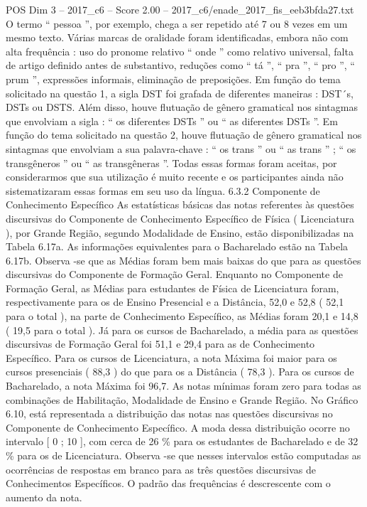 \begin{textsample}{POS Dim 3 – 2017\_c6 – Score 2.00 – 2017\_c6/enade\_2017\_fis\_eeb3bfda27.txt}
O termo “ pessoa ”, por exemplo, chega a ser repetido até 7 ou 8 vezes em um mesmo texto.
Várias marcas de oralidade foram identificadas, embora não com alta frequência : uso do pronome relativo “ onde ” como relativo universal, falta de artigo definido antes de substantivo, reduções como “ tá ”, “ pra ”, “ pro ”, “ prum ”, expressões informais, eliminação de preposições.
Em função do tema solicitado na questão 1, a sigla DST foi grafada de diferentes maneiras : DST´s, DSTs ou DSTS.
Além disso, houve flutuação de gênero gramatical nos sintagmas que envolviam a sigla : “ os diferentes DSTs ” ou “ as diferentes DSTs ”.
Em função do tema solicitado na questão 2, houve flutuação de gênero gramatical nos sintagmas que envolviam a sua palavra-chave : “ os trans ” ou “ as trans ” ; “ os transgêneros ” ou “ as transgêneras ”.
Todas essas formas foram aceitas, por considerarmos que sua utilização é muito recente e os participantes ainda não sistematizaram essas formas em seu uso da língua. 6.3.2 Componente de Conhecimento Específico As estatísticas básicas das notas referentes às questões discursivas do Componente de Conhecimento Específico de Física ( Licenciatura ), por Grande Região, segundo Modalidade de Ensino, estão disponibilizadas na Tabela 6.17a.
As informações equivalentes para o Bacharelado estão na Tabela 6.17b.
Observa -se que as Médias foram bem mais baixas do que para as questões discursivas do Componente de Formação Geral.
Enquanto no Componente de Formação Geral, as Médias para estudantes de Física de Licenciatura foram, respectivamente para os de Ensino Presencial e a Distância, 52,0 e 52,8 ( 52,1 para o total ), na parte de Conhecimento Específico, as Médias foram 20,1 e 14,8 ( 19,5 para o total ).
Já para os cursos de Bacharelado, a média para as questões discursivas de Formação Geral foi 51,1 e 29,4 para as de Conhecimento Específico.
Para os cursos de Licenciatura, a nota Máxima foi maior para os cursos presenciais ( 88,3 ) do que para os a Distância ( 78,3 ).
Para os cursos de Bacharelado, a nota Máxima foi 96,7.
As notas mínimas foram zero para todas as combinações de Habilitação, Modalidade de Ensino e Grande Região.
No Gráfico 6.10, está representada a distribuição das notas nas questões discursivas no Componente de Conhecimento Específico.
A moda dessa distribuição ocorre no intervalo [ 0 ; 10 ], com cerca de 26 \% para os estudantes de Bacharelado e de 32 \% para os de Licenciatura.
Observa -se que nesses intervalos estão computadas as ocorrências de respostas em branco para as três questões discursivas de Conhecimentos Específicos.
O padrão das frequências é descrescente com o aumento da nota.

\end{textsample}
